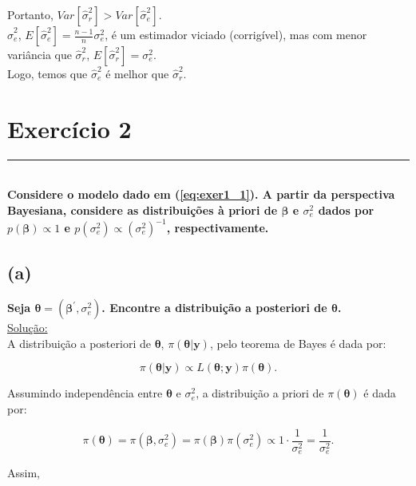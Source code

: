 \documentclass[12pt, oldfontcommands]{article}\usepackage[]{graphicx}\usepackage[]{color}
\newcommand{\horrule}[1]{\rule{\linewidth}{#1}}
\begin{document}
Portanto,
\(\boxed{Var[\hat{\sigma}_{r}^{2}] > Var[\hat{\sigma}_{e}^{2}]}\). \\

\(\hat{\sigma}_{e}^{2}\),
\(E[\hat{\sigma}_{e}^{2}] = \frac{n - 1}{n} \sigma_{e}^{2}\), é um
estimador viciado (corrigível), mas com menor variância que
\(\hat{\sigma}_{r}^{2}\), \(E[\hat{\sigma}_{r}^{2}] = \sigma_{e}^{2}\).
\\

Logo, temos que
\(\hat{\sigma}_{e}^{2}\) é melhor que \(\hat{\sigma}_{r}^{2}\).

\section*{Exercício 2} 

\horrule{1pt} \\

\textbf{Considere o modelo dado em (\ref{eq:exer1_1}). A partir da
        perspectiva Bayesiana, considere as distribuições à priori de
        \(\bm{\beta}\) e \(\sigma_{e}^{2}\) dados por
        \(p(\bm{\beta}) \propto 1\) e
        \(p(\sigma_{e}^{2}) \propto (\sigma_{e}^{2})^{-1}\),
        respectivamente.}

\subsection*{(a)} 

\textbf{Seja \(\bm{\theta} = (\bm{\beta}^{'}, \sigma_{e}^{2})\).
        Encontre a distribuição a posteriori de \(\bm{\theta}\).} \\

\underline{Solução:} \\

A distribuição a posteriori de \(\bm{\theta}\),
\(\pi(\bm{\theta} | \mathbf{y})\), pelo teorema de Bayes é dada por:

\[ \pi(\bm{\theta} | \mathbf{y}) \propto
   L(\bm{\theta}; \mathbf{y}) \pi(\bm{\theta}). \]

Assumindo independência entre \(\bm{\theta}\) e \(\sigma_{e}^{2}\), a
distribuição a priori de \(\pi(\bm{\theta})\) é dada por:

\[ \pi(\bm{\theta}) = \pi(\bm{\beta}, \sigma_{e}^{2}) =
   \pi(\bm{\beta}) \pi(\sigma_{e}^{2}) \propto
   1 \cdot \frac{1}{\sigma_{e}^{2}} = \frac{1}{\sigma_{e}^{2}}. \]

Assim,
\end{document}
